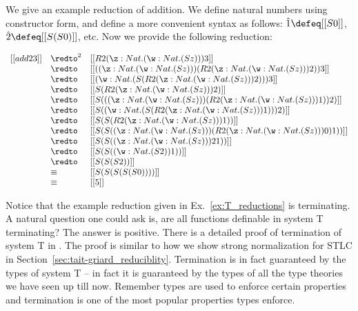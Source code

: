 \begin{example}
  \label{ex:T_reductions}
  We give an example reduction of addition.  We define natural numbers using constructor
  form, and define a more convenient syntax as follows:  
  $\hat{1} \defeq [[S 0]]$, $\hat{2} \defeq [[S (S 0)]]$, etc.  Now we provide the following
  reduction:
  \begin{center}
    \begin{math}
      \begin{array}{lll}
        [[add 2 3]] & \redto^2 &  [[R 2 (\z:Nat.(\w:Nat.(S z))) 3]]\\
             & \redto   & [[((\z:Nat.(\w:Nat.(S z))) (R 2 (\z:Nat.(\w:Nat.(S z))) 2)) 3]]\\
             & \redto   & [[(\w:Nat.(S (R 2 (\z:Nat.(\w:Nat.(S z))) 2))) 3]]\\
             & \redto   & [[S (R 2 (\z:Nat.(\w:Nat.(S z))) 2)]]\\
             & \redto   & [[S (((\z:Nat.(\w:Nat.(S z))) (R 2 (\z:Nat.(\w:Nat.(S z))) 1)) 2)]]\\
             & \redto   & [[S ((\w:Nat.(S (R 2 (\z:Nat.(\w:Nat.(S z))) 1))) 2)]]\\
             & \redto   & [[S (S (R 2 (\z:Nat.(\w:Nat.(S z))) 1))]]\\
             & \redto   & [[S (S ((\z:Nat.(\w:Nat.(S z))) (R 2 (\z:Nat.(\w:Nat.(S z))) 0) 1))]]\\
             & \redto   & [[S (S ((\z:Nat.(\w:Nat.(S z))) 2 1))]]\\
             & \redto   & [[S (S ((\w:Nat.(S 2)) 1))]]\\
             & \redto   & [[S (S (S 2))]] \\
             & \equiv   & [[S (S (S (S (S 0))))]] \\
             & \equiv   & [[5]]
      \end{array}
    \end{math}
  \end{center}
\end{example}

Notice that the example reduction given in Ex.~\ref{ex:T_reductions}
is terminating.  A natural question one could ask is, are all
functions definable in system T terminating?  The answer is positive.
There is a detailed proof of termination of system T in
\cite{Girard:1989}.  The proof is similar to how we show strong
normalization for STLC in
Section~\ref{sec:tait-griard_reduciblity}. Termination is in fact
guaranteed by the types of system T -- in fact it is guaranteed by the
types of all the type theories we have seen up till now.  Remember
types are used to enforce certain properties and termination is one of
the most popular properties types enforce.
